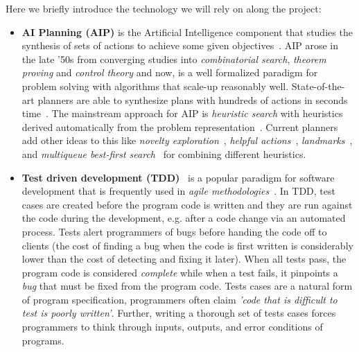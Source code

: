 \documentclass[10pt,a4paper]{paper}
\begin{document}
Here we briefly introduce the technology we will rely on along the project:
\begin{itemize}
\item {\bf AI Planning (AIP)} is the Artificial Intelligence component that studies the synthesis of sets of actions to achieve some given objectives~\cite{ghallab2004automated}. AIP arose in the late ’50s from converging studies into {\em combinatorial search}, {\em theorem proving} and {\em control theory} and now, is a well formalized paradigm for problem solving with algorithms that scale-up reasonably well. State-of-the-art planners are able to synthesize plans with hundreds of actions in seconds time~\cite{geffner2013concise}.  The mainstream approach for AIP is {\em heuristic search} with heuristics derived automatically from the problem representation~\cite{mcdermott1996heuristic,bonet2001planning}.  Current planners add other ideas to this like {\it novelty exploration}~\cite{geffner:psimulators:IJCAI17}, {\it helpful actions}~\cite{hoffmann2001ff}, {\it landmarks}~\cite{helmert2006fast}, and {\it multiqueue best-first search}~\cite{richter2010lama} for combining different heuristics.
  
\item {\bf Test driven development (TDD)}~\cite{beck:TDD:2003} is a popular paradigm for software development that is frequently used in {\it agile methodologies}~\cite{cohen2003agile}. In TDD, test cases are created before the program code is written and they are run against the code during the development, e.g. after a code change via an automated process. Tests alert programmers of bugs before handing the code off to clients (the cost of finding a bug when the code is first written is considerably lower than the cost of detecting and fixing it later). When all tests pass, the program code is considered {\em complete} while when a test fails, it pinpoints a {\em bug} that must be fixed from the program code. Tests cases are a natural form of program specification, programmers often claim {\em 'code that is difficult to test is poorly written'}. Further, writing a thorough set of tests cases forces programmers to think through inputs, outputs, and error conditions of programs. 
\end{itemize}
\end{document}

